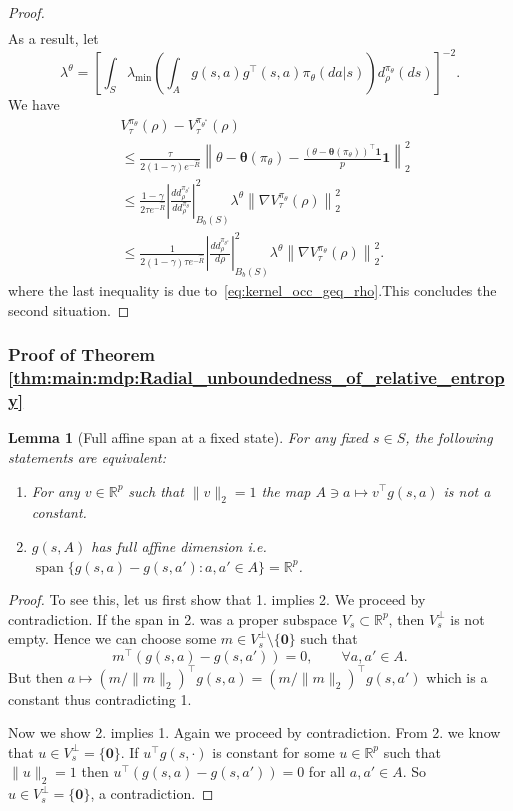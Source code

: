 \documentclass{amsart}
\newtheorem{lemma}[theorem]{Lemma}
\theoremstyle{definition}
\begin{document}
\begin{proof}
{\begin{align*}
\end{align*}
}
As a result, let
\[
\lambda^{\theta} = \left[\int_{S}\lambda_{\min}\left(\int_{A} g(s,a)g^\top(s,a)\pi_\theta(da|s)\right)d^{\pi_{\theta}}_{\rho}(ds)\right]^{-2}.
\]
We have
\begin{align*}
& V_\tau^{\pi_\theta}(\rho) - V_\tau^{\pi_{\theta^*}}(\rho)\\
& \leq \frac{\tau }{2(1-\gamma) e^{-\hat{R}}}\left\|\theta - \boldsymbol{\theta}(\pi_\theta) - \frac{(\theta - \boldsymbol{\theta}(\pi_\theta))^\top\textbf{1}}{p}\textbf{1}\right\|_{2}^2\\
& \leq \frac{1-\gamma}{2\tau e^{-\hat{R}}}\left|\frac{d d_\rho^{\pi_{\theta^*}}}{ d d_{\rho}^{\pi_\theta}}\right|^2_{B_b(S)} \lambda^\theta \left\|\nabla V_\tau^{\pi_\theta}(\rho)\right\|_2^2 \\
& \leq \frac{1}{2(1-\gamma)\tau e^{-\hat{R}}}\left|\frac{d d_\rho^{\pi_{\theta^*}}}{ d \rho}\right|^2_{B_b(S)} \lambda^\theta \left\|\nabla V_\tau^{\pi_\theta}(\rho)\right\|_2^2 .
\end{align*}
where the last inequality is due to~\eqref{eq:kernel_occ_geq_rho}.This concludes the second situation.
\end{proof}


\subsubsection{Proof of Theorem \ref{thm:main:mdp:Radial_unboundedness_of_relative_entropy}}
\label{sec:pf_Radial_unboundedness_of_relative_entropy}

\aspAffineMaxSet*

\begin{lemma}[Full affine span at a fixed state]\label{rem:app:mdp:affine_span}
For any fixed $s\in S$, the following statements are equivalent:
\begin{enumerate}
\item For any $v \in \mathbb R^p$ such that $\|v\|_2 = 1$ the map $A \ni a \mapsto v^\top g(s,a)$ is not a constant.
\item $g(s,A)$ has full affine dimension i.e. $\operatorname{span}\{g(s,a)-g(s,a'):a,a'\in A\}=\mathbb R^p$.
\end{enumerate}
\end{lemma}

\begin{proof}
To see this, let us first show that 1. implies 2.
We proceed by contradiction.
If the span in 2. was a proper subspace $V_s \subset \mathbb R^p$,
then $V_s^\perp$ is not empty. 
Hence we can choose some $m\in V_s^\perp\setminus\{\mathbf 0\}$ such that
\[
m^\top(g(s,a)-g(s,a'))=0,\qquad \forall a,a'\in A.
\]
But then $a\mapsto (m/\|m\|_2)^\top g(s,a) = (m/\|m\|_2)^\top g(s,a')$ which is a constant thus contradicting 1.

Now we show 2. implies 1.
Again we proceed by contradiction.
From 2. we know that $u\in V_s^\perp=\{\mathbf 0\}$.
If $u^\top g(s,\cdot)$ is constant for some
$u\in \mathbb R^p$ such that $\|u\|_2 = 1$ then $u^\top(g(s,a)-g(s,a'))=0$ for all
$a,a'\in A$.
So $u\in V_s^\perp=\{\mathbf 0\}$, a contradiction. 
\end{proof}
\end{document}
